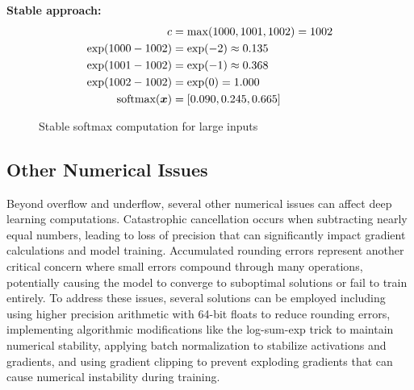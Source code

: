 \textbf{Stable approach:}
\begin{align}
c &= \max(1000, 1001, 1002) = 1002 \\
\exp(1000-1002) &= \exp(-2) \approx 0.135 \\
\exp(1001-1002) &= \exp(-1) \approx 0.368 \\
\exp(1002-1002) &= \exp(0) = 1.000 \\
\text{softmax}(\boldsymbol{x}) &= [0.090, 0.245, 0.665]
\end{align}

\begin{figure}[h]
\centering
{}
\caption{Stable softmax computation for large inputs}
\label{fig:stable-softmax}
\end{figure}

\subsection{Other Numerical Issues}

Beyond overflow and underflow, several other numerical issues can affect deep learning computations. Catastrophic cancellation occurs when subtracting nearly equal numbers, leading to loss of precision that can significantly impact gradient calculations and model training. Accumulated rounding errors represent another critical concern where small errors compound through many operations, potentially causing the model to converge to suboptimal solutions or fail to train entirely. To address these issues, several solutions can be employed including using higher precision arithmetic with 64-bit floats to reduce rounding errors, implementing algorithmic modifications like the log-sum-exp trick to maintain numerical stability, applying batch normalization to stabilize activations and gradients, and using gradient clipping to prevent exploding gradients that can cause numerical instability during training.
